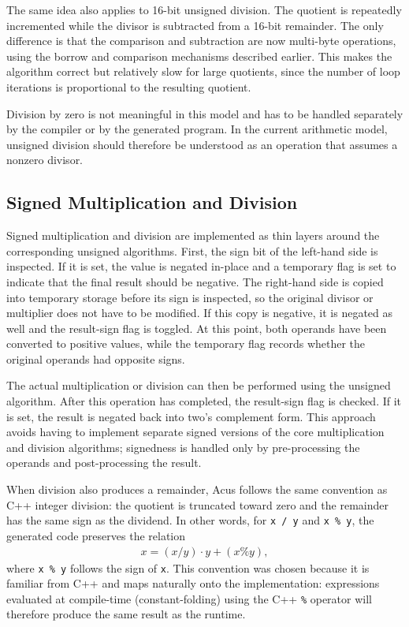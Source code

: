 The same idea also applies to 16-bit unsigned division. The quotient is repeatedly incremented while the divisor is subtracted from a 16-bit remainder. The only difference is that the comparison and subtraction are now multi-byte operations, using the borrow and comparison mechanisms described earlier. This makes the algorithm correct but relatively slow for large quotients, since the number of loop iterations is proportional to the resulting quotient.

Division by zero is not meaningful in this model and has to be handled separately by the compiler or by the generated program. In the current arithmetic model, unsigned division should therefore be understood as an operation that assumes a nonzero divisor.


\subsection{Signed Multiplication and Division}
Signed multiplication and division are implemented as thin layers around the corresponding unsigned algorithms. First, the sign bit of the left-hand side is inspected. If it is set, the value is negated in-place and a temporary flag is set to indicate that the final result should be negative. The right-hand side is copied into temporary storage before its sign is inspected, so the original divisor or multiplier does not have to be modified. If this copy is negative, it is negated as well and the result-sign flag is toggled. At this point, both operands have been converted to positive values, while the temporary flag records whether the original operands had opposite signs.

The actual multiplication or division can then be performed using the unsigned algorithm. After this operation has completed, the result-sign flag is checked. If it is set, the result is negated back into two's complement form. This approach avoids having to implement separate signed versions of the core multiplication and division algorithms; signedness is handled only by pre-processing the operands and post-processing the result.

When division also produces a remainder, Acus follows the same convention as C++ integer division: the quotient is truncated toward zero and the remainder has the same sign as the dividend. In other words, for \texttt{x / y} and \texttt{x \% y}, the generated code preserves the relation
%
\begin{align}
  x = (x / y)\cdot y + (x\%y),
\end{align}
%
where \texttt{x \% y} follows the sign of \texttt{x}. This convention was chosen because it is familiar from C++ and maps naturally onto the implementation: expressions evaluated at compile-time (constant-folding) using the C++ \texttt{\%} operator will therefore produce the same result as the runtime.

